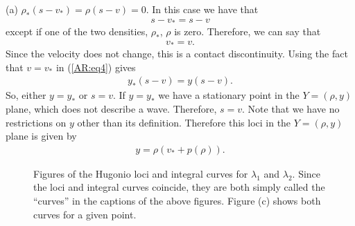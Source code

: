 \documentclass{article}
\begin{document}
(a) $\rho_*(s - v_*) = \rho (s - v) = 0$. In this case we have that
\begin{align*}
s - v_* = s - v 
\end{align*}
except if one of the two densities, $\rho_*$, $\rho$ is zero. Therefore, we can say that
\begin{align*}
v_* = v.
\end{align*}
Since the velocity does not change, this is a contact discontinuity. Using the fact that $v = v_*$ in (\ref{AR:eq4}) gives
\begin{align*}
y_*(s - v) = y(s - v).
\end{align*}
So, either $y = y_*$ or $s = v$. If $y = y_*$ we have a stationary point in the $Y = (\rho, y)$ plane, which does not 
describe a wave. Therefore, $s = v$. Note that we have no restrictions on $y$ other than its definition. 
Therefore this loci in the $Y = (\rho, y)$ plane is given by 
\begin{align*}
y = \rho ( v_* + p(\rho )).
\end{align*}

\begin{figure}[H]
 \centering
 \caption[Optional caption for list of figures]
 {Figures of the Hugonio loci and integral curves for $\lambda_1$ and $\lambda_2$. 
 Since the loci and integral curves coincide, they are 
 both simply called the ``curves'' in the captions of the above figures. 
 Figure (c) shows both curves for a given point.}
  \label{fig:AR_curves}
\end{figure}
\end{document}
